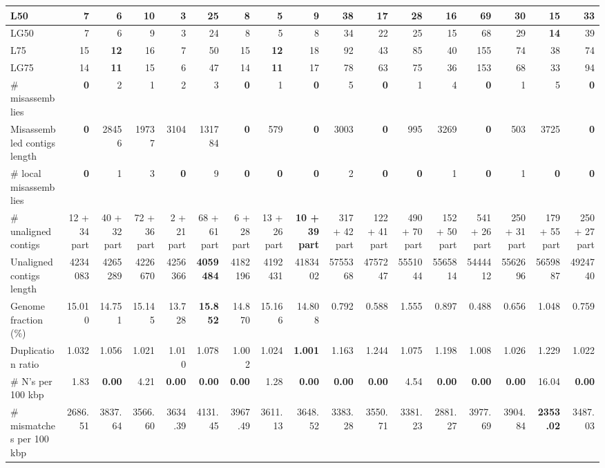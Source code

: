 \documentclass[12pt,a4paper]{article}
\begin{document}
\begin{table}[ht]
\begin{center}
\begin{tabular}{|l*{16}{|r}|}
L50 & 7 & 6 & {\bf 10} & 3 & 25 & 8 & 5 & 9 & 38 & 17 & 28 & 16 & 69 & 30 & 15 & 33 \\ \hline
LG50 & 7 & 6 & 9 & 3 & 24 & 8 & 5 & 8 & 34 & 22 & 25 & 15 & 68 & 29 & {\bf 14} & 39 \\ \hline
L75 & 15 & {\bf 12} & 16 & 7 & 50 & 15 & {\bf 12} & 18 & 92 & 43 & 85 & 40 & 155 & 74 & 38 & 74 \\ \hline
LG75 & 14 & {\bf 11} & 15 & 6 & 47 & 14 & {\bf 11} & 17 & 78 & 63 & 75 & 36 & 153 & 68 & 33 & 94 \\ \hline
\# misassemblies & {\bf 0} & 2 & 1 & 2 & 3 & {\bf 0} & 1 & {\bf 0} & 5 & {\bf 0} & 1 & 4 & {\bf 0} & 1 & 5 & {\bf 0} \\ \hline
Misassembled contigs length & {\bf 0} & 28456 & 19737 & 3104 & 131784 & {\bf 0} & 579 & {\bf 0} & 3003 & {\bf 0} & 995 & 3269 & {\bf 0} & 503 & 3725 & {\bf 0} \\ \hline
\# local misassemblies & {\bf 0} & 1 & 3 & {\bf 0} & 9 & {\bf 0} & {\bf 0} & {\bf 0} & 2 & {\bf 0} & {\bf 0} & 1 & {\bf 0} & 1 & {\bf 0} & {\bf 0} \\ \hline
\# unaligned contigs & 12 + 34 part & 40 + 32 part & 72 + 36 part & 2 + 21 part & 68 + 61 part & 6 + 28 part & 13 + 26 part & {\bf 10 + 39 part} & 317 + 42 part & 122 + 41 part & 490 + 70 part & 152 + 50 part & 541 + 26 part & 250 + 31 part & 179 + 55 part & 250 + 27 part \\ \hline
Unaligned contigs length & 4234083 & 4265289 & 4226670 & 4256366 & {\bf 4059484} & 4182196 & 4192431 & 4183402 & 5755368 & 4757247 & 5551044 & 5565814 & 5444412 & 5562696 & 5659887 & 4924740 \\ \hline
Genome fraction (\%) & 15.010 & 14.751 & 15.145 & 13.728 & {\bf 15.852} & 14.870 & 15.166 & 14.808 & 0.792 & 0.588 & 1.555 & 0.897 & 0.488 & 0.656 & 1.048 & 0.759 \\ \hline
Duplication ratio & 1.032 & 1.056 & 1.021 & 1.010 & 1.078 & 1.002 & 1.024 & {\bf 1.001} & 1.163 & 1.244 & 1.075 & 1.198 & 1.008 & 1.026 & 1.229 & 1.022 \\ \hline
\# N's per 100 kbp & 1.83 & {\bf 0.00} & 4.21 & {\bf 0.00} & {\bf 0.00} & {\bf 0.00} & 1.28 & {\bf 0.00} & {\bf 0.00} & {\bf 0.00} & 4.54 & {\bf 0.00} & {\bf 0.00} & {\bf 0.00} & 16.04 & {\bf 0.00} \\ \hline
\# mismatches per 100 kbp & 2686.51 & 3837.64 & 3566.60 & 3634.39 & 4131.45 & 3967.49 & 3611.13 & 3648.52 & 3383.28 & 3550.71 & 3381.23 & 2881.27 & 3977.69 & 3904.84 & {\bf 2353.02} & 3487.03 \\ \hline

\end{tabular}
\end{center}
\end{table}
\end{document}
